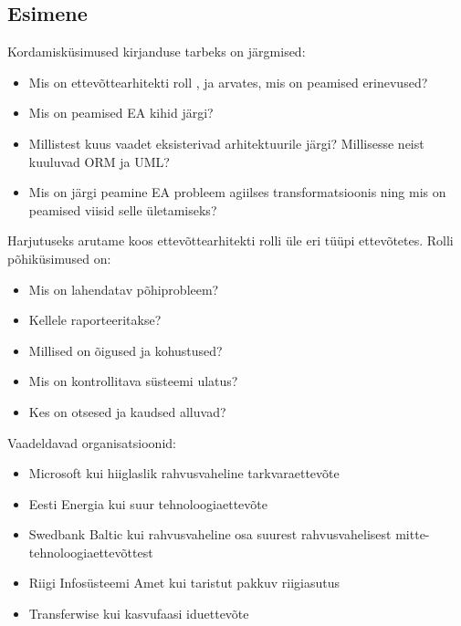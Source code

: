 \documentclass[nobib]{tufte-handout}
\begin{document}
\subsection{Esimene}

Kordamisküsimused kirjanduse tarbeks on järgmised:
\begin{itemize}
	\item Mis on ettevõttearhitekti roll \citeauthor{parsons2005enterprise}, \citeauthor{sysengineering} ja \citeauthor{winter2006essential} arvates, mis on peamised erinevused?
	\item Mis on peamised EA kihid \cite{winter2006essential} järgi?
	\item Millistest kuus vaadet eksisterivad arhitektuurile \citeauthor{sysengineering} järgi? Millisesse neist kuuluvad ORM ja UML?
	\item Mis on \citeauthor{hickey} järgi peamine EA probleem agiilses transformatsioonis ning mis on peamised viisid selle ületamiseks?
\end{itemize}

Harjutuseks arutame koos ettevõttearhitekti rolli üle eri tüüpi ettevõtetes. Rolli põhiküsimused on:
\begin{itemize}
	\item Mis on lahendatav põhiprobleem?
	\item Kellele raporteeritakse?
	\item Millised on õigused ja kohustused?
	\item Mis on kontrollitava süsteemi ulatus?
	\item Kes on otsesed ja kaudsed alluvad?
\end{itemize}

Vaadeldavad organisatsioonid:
\begin{itemize}
	\item Microsoft kui hiiglaslik rahvusvaheline tarkvaraettevõte
	\item Eesti Energia kui suur tehnoloogiaettevõte
	\item Swedbank Baltic kui rahvusvaheline osa suurest rahvusvahelisest mitte-tehnoloogiaettevõttest
	\item Riigi Infosüsteemi Amet kui taristut pakkuv riigiasutus
	\item Transferwise kui kasvufaasi iduettevõte
\end{itemize}
\end{document}
